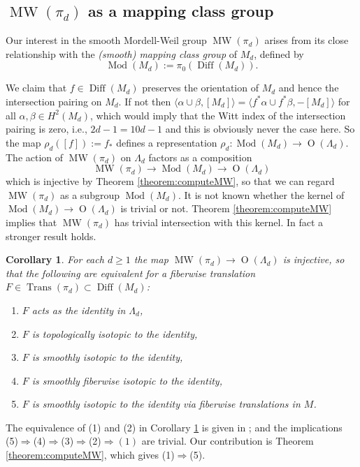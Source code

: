\documentclass[10pt,letterpaper]{amsart}
\numberwithin{equation}{section}
\def\la{\langle}
\def\ra{\rangle}
\newcommand\Diff{\operatorname{Diff}}
\newcommand\Mod{\operatorname{Mod}}
\newcommand\MW{\operatorname{MW}}
\newcommand\Orth{\operatorname{O}}
\newcommand\Trans{\operatorname{Trans}}
\newtheorem{corollary}[theorem]{Corollary}
\theoremstyle{remark}
\begin{document}
\subsection{$\MW(\pi_d)$ as a mapping class group}  Our interest in the smooth Mordell-Weil group $\MW(\pi_d)$ arises from its close relationship with the {\em (smooth) mapping class group} of $M_d$, defined by
\[\Mod(M_d):=\pi_0(\Diff(M_d)).\]  

We claim that $f\in\Diff(M_d)$ preserves the orientation of $M_d$ and hence the intersection pairing on $M_d$.  If not then 
$\la \alpha\cup\beta, [M_d]\ra =\la f^*\alpha\cup f^*\beta, -[M_d]\ra $ for all $\alpha, \beta\in H^2(M_d)$, which would imply 
that the  Witt index of the intersection pairing is zero, i.e.,  $2d-1=10d-1$ and this is obviously never the case here.
So the map $\rho_d([f]):=f_*$ defines a representation $\rho_d:\Mod(M_d)\to \Orth(\Lambda_d)$.  The action of $\MW(\pi_d)$ on $\Lambda_d$ factors as a composition
\[
 \MW(\pi_d)\to \Mod(M_d)\to\Orth(\Lambda_d)
 \]
which is injective by Theorem \ref{theorem:computeMW}, so that we 
can regard $\MW(\pi_d)$ as a subgroup $\Mod(M_d)$.  It is not known whether the kernel of 
$\Mod(M_d)\to \Orth(\Lambda_d)$ is trivial or not.  Theorem \ref{theorem:computeMW} implies that $\MW(\pi_d)$ has trivial intersection with this kernel.  In fact a stronger result holds.

\begin{corollary}\label{cor:isomorphisms1}
For each $d\geq 1$ the map $\MW(\pi_d)\to \Orth(\Lambda_d)$ is injective, so that the following are equivalent for a fiberwise translation $F\in\Trans(\pi_d)\subset\Diff(M_d)$: 
\begin{enumerate}
\item $F$  acts as the identity in $\Lambda_d$,
\item $F$ is topologically isotopic to the identity,
\item $F$ is smoothly isotopic to the identity,
\item $F$ is smoothly fiberwise isotopic to the identity,
\item $F$ is smoothly isotopic to the identity via fiberwise translations in $M$.
\end{enumerate}
\end{corollary}

The equivalence of (1) and (2) in Corollary  \ref{cor:isomorphisms1} is 
given in \cite{GGHKP}; and  the implications (5)$\Rightarrow$(4)$\Rightarrow$(3)$\Rightarrow$(2)$\Rightarrow(1)$ are trivial.  Our contribution is Theorem \ref{theorem:computeMW}, which gives (1)$\Rightarrow$(5).
\\
\end{document}
